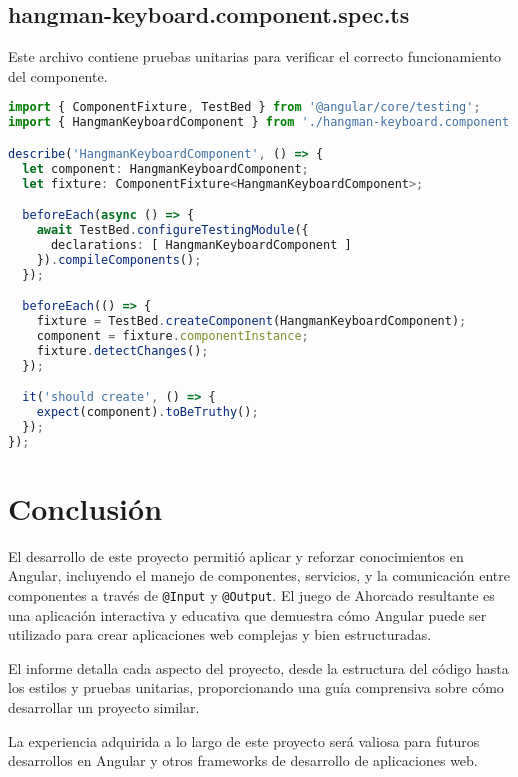 \subsection{hangman-keyboard.component.spec.ts}

Este archivo contiene pruebas unitarias para verificar el correcto funcionamiento del componente.

\begin{lstlisting}[language=TypeScript]
import { ComponentFixture, TestBed } from '@angular/core/testing';
import { HangmanKeyboardComponent } from './hangman-keyboard.component';

describe('HangmanKeyboardComponent', () => {
  let component: HangmanKeyboardComponent;
  let fixture: ComponentFixture<HangmanKeyboardComponent>;

  beforeEach(async () => {
    await TestBed.configureTestingModule({
      declarations: [ HangmanKeyboardComponent ]
    }).compileComponents();
  });

  beforeEach(() => {
    fixture = TestBed.createComponent(HangmanKeyboardComponent);
    component = fixture.componentInstance;
    fixture.detectChanges();
  });

  it('should create', () => {
    expect(component).toBeTruthy();
  });
});
\end{lstlisting}

\section{Conclusión}

El desarrollo de este proyecto permitió aplicar y reforzar conocimientos en Angular, incluyendo el manejo de componentes, servicios, y la comunicación entre componentes a través de \texttt{@Input} y \texttt{@Output}. El juego de Ahorcado resultante es una aplicación interactiva y educativa que demuestra cómo Angular puede ser utilizado para crear aplicaciones web complejas y bien estructuradas.

El informe detalla cada aspecto del proyecto, desde la estructura del código hasta los estilos y pruebas unitarias, proporcionando una guía comprensiva sobre cómo desarrollar un proyecto similar.

La experiencia adquirida a lo largo de este proyecto será valiosa para futuros desarrollos en Angular y otros frameworks de desarrollo de aplicaciones web.